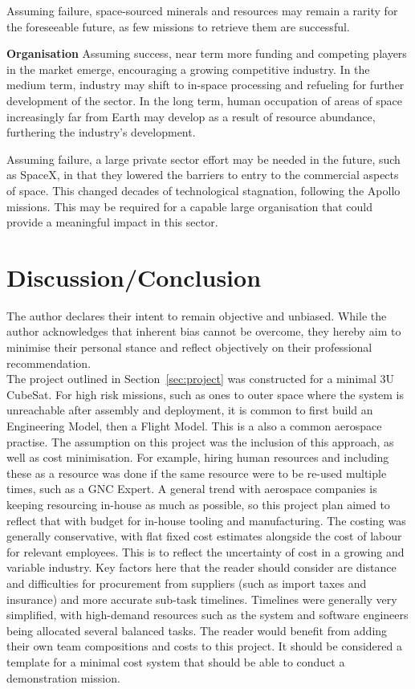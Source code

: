 \documentclass[conference]{IEEEtran}
\begin{document}
Assuming failure, space-sourced minerals and resources may remain a rarity for the foreseeable future, as few missions to retrieve them are successful.

\textbf{Organisation}
Assuming success, near term more funding and competing players in the market emerge, encouraging a growing competitive industry. In the medium term, industry may shift to in-space processing and refueling for further development of the sector. In the long term, human occupation of areas of space increasingly far from Earth may develop as a result of resource abundance, furthering the industry's development.

Assuming failure, a large private sector effort may be needed in the future, such as SpaceX, in that they lowered the barriers to entry to the commercial aspects of space. This changed decades of technological stagnation, following the Apollo missions. This may be required for a capable large organisation that could provide a meaningful impact in this sector.

\section{Discussion/Conclusion}\label{sec:discussion}
The author declares their intent to remain objective and unbiased. While the author acknowledges that inherent bias cannot be overcome, they hereby aim to minimise their personal stance and reflect objectively on their professional recommendation. \\

The project outlined in Section~\ref{sec:project} was constructed for a minimal 3U CubeSat. For high risk missions, such as ones to outer space where the system is unreachable after assembly and deployment, it is common to first build an Engineering Model, then a Flight Model. This is a also a common aerospace practise. The assumption on this project was the inclusion of this approach, as well as cost minimisation. For example, hiring human resources and including these as a resource was done if the same resource were to be re-used multiple times, such as a GNC Expert. A general trend with aerospace companies is keeping resourcing in-house as much as possible, so this project plan aimed to reflect that with budget for in-house tooling and manufacturing. The costing was generally conservative, with flat fixed cost estimates alongside the cost of labour for relevant employees. This is to reflect the uncertainty of cost in a growing and variable industry. Key factors here that the reader should consider are distance and difficulties for procurement from suppliers (such as import taxes and insurance) and more accurate sub-task timelines. Timelines were generally very simplified, with high-demand resources such as the system and software engineers being allocated several balanced tasks. The reader would benefit from adding their own team compositions and costs to this project. It should be considered a template for a minimal cost system that should be able to conduct a demonstration mission. 
\end{document}
